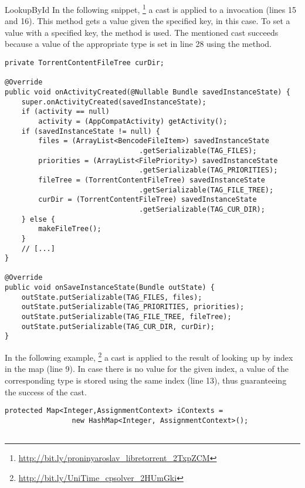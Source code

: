\begin{pattern}{LookupById}
In the following snippet,%
\footnote{\url{http://bit.ly/proninyaroslav_libretorrent_2TxpZCM}}
a cast is applied to a  invocation (lines 15 and 16).
This method gets a  value given the specified key,  in this case.
To set a value with a specified key, the  method is used.
The mentioned cast succeeds because a value of the appropriate type is set in line 28 using the  method.

\begin{verbatim}
private TorrentContentFileTree curDir;

@Override
public void onActivityCreated(@Nullable Bundle savedInstanceState) {
    super.onActivityCreated(savedInstanceState);
    if (activity == null)
        activity = (AppCompatActivity) getActivity();
    if (savedInstanceState != null) {
        files = (ArrayList<BencodeFileItem>) savedInstanceState
                                .getSerializable(TAG_FILES);
        priorities = (ArrayList<FilePriority>) savedInstanceState
                                .getSerializable(TAG_PRIORITIES);
        fileTree = (TorrentContentFileTree) savedInstanceState
                                .getSerializable(TAG_FILE_TREE);
        curDir = (TorrentContentFileTree) savedInstanceState
                                .getSerializable(TAG_CUR_DIR);
    } else {
        makeFileTree();
    }
    // [...]
}

@Override
public void onSaveInstanceState(Bundle outState) {
    outState.putSerializable(TAG_FILES, files);
    outState.putSerializable(TAG_PRIORITIES, priorities);
    outState.putSerializable(TAG_FILE_TREE, fileTree);
    outState.putSerializable(TAG_CUR_DIR, curDir);
}
\end{verbatim}

In the following example,%
\footnote{\url{http://bit.ly/UniTime_cpsolver_2HUmGki}}
a cast is applied to the result of looking up by index in the  map (line 9).
In case there is no value for the given index,
a value of the corresponding type is stored using the same index (line 13),
thus guaranteeing the success of the cast.

\begin{verbatim}
protected Map<Integer,AssignmentContext> iContexts =
                new HashMap<Integer, AssignmentContext>();


\end{verbatim}
\end{pattern}
